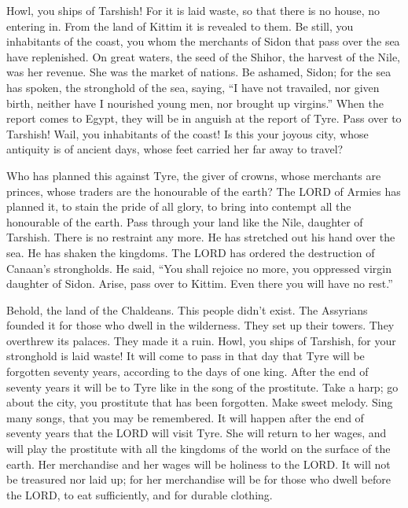 Howl, you ships of Tarshish! For it is laid waste, so that there is no
house, no entering in. From the land of Kittim it is revealed to them.
 Be still, you inhabitants of the coast, you whom the
merchants of Sidon that pass over the sea have replenished. 
On great waters, the seed of the Shihor, the harvest of the Nile, was
her revenue. She was the market of nations.  Be ashamed,
Sidon; for the sea has spoken, the stronghold of the sea, saying, ``I
have not travailed, nor given birth, neither have I nourished young men,
nor brought up virgins.''  When the report comes to Egypt,
they will be in anguish at the report of Tyre.  Pass over to
Tarshish! Wail, you inhabitants of the coast!  Is this your
joyous city, whose antiquity is of ancient days, whose feet carried her
far away to travel?

 Who has planned this against Tyre, the giver of crowns,
whose merchants are princes, whose traders are the honourable of the
earth?  The LORD of Armies has planned it, to stain the
pride of all glory, to bring into contempt all the honourable of the
earth.  Pass through your land like the Nile, daughter of
Tarshish. There is no restraint any more.  He has stretched
out his hand over the sea. He has shaken the kingdoms. The LORD has
ordered the destruction of Canaan's strongholds.  He said,
``You shall rejoice no more, you oppressed virgin daughter of Sidon.
Arise, pass over to Kittim. Even there you will have no rest.''

 Behold, the land of the Chaldeans. This people didn't
exist. The Assyrians founded it for those who dwell in the wilderness.
They set up their towers. They overthrew its palaces. They made it a
ruin.  Howl, you ships of Tarshish, for your stronghold is
laid waste!  It will come to pass in that day that Tyre
will be forgotten seventy years, according to the days of one king.
After the end of seventy years it will be to Tyre like in the song of
the prostitute.  Take a harp; go about the city, you
prostitute that has been forgotten. Make sweet melody. Sing many songs,
that you may be remembered.  It will happen after the end
of seventy years that the LORD will visit Tyre. She will return to her
wages, and will play the prostitute with all the kingdoms of the world
on the surface of the earth.  Her merchandise and her wages
will be holiness to the LORD. It will not be treasured nor laid up; for
her merchandise will be for those who dwell before the LORD, to eat
sufficiently, and for durable clothing.

